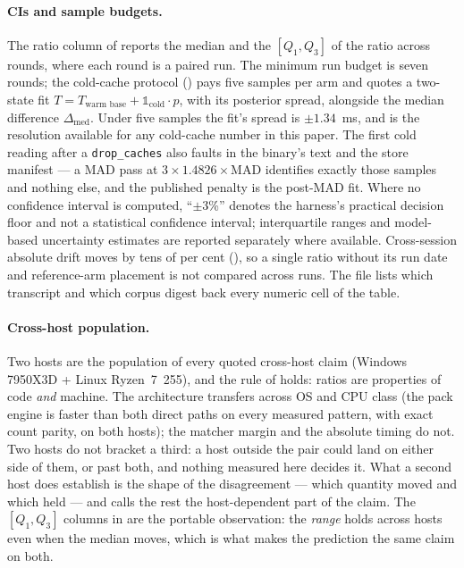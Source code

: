 \documentclass[11pt,letterpaper]{article}
\begin{document}
\paragraph{CIs and sample budgets.}
The ratio column of  reports the median and the
$[Q_1,Q_3]$ of the ratio across rounds, where each round is a paired
run. The minimum run budget is seven rounds; the cold-cache protocol
() pays five samples per arm and quotes a
two-state fit
$T = T_{\text{warm base}} + \mathbb{1}_{\text{cold}} \cdot p$, with its
posterior spread, alongside the median difference $\Delta_{\text{med}}$.
Under five samples the fit's spread is $\pm 1.34$~ms, and is the
resolution available for any cold-cache number in this paper. The first
cold reading after a \texttt{drop\_caches} also faults in the binary's
text and the store manifest --- a MAD pass at
$3 \times 1.4826 \times \text{MAD}$ identifies exactly those samples and
nothing else, and the published penalty is the post-MAD fit. Where no
confidence interval is computed, ``$\pm 3$\%'' denotes the harness's
practical decision floor and not a statistical confidence interval;
interquartile ranges and model-based uncertainty estimates are reported
separately where available. Cross-session absolute drift moves by tens of
per cent (), so a single ratio without its run date and
reference-arm placement is not compared across runs. The
 file lists which transcript and which corpus
digest back every numeric cell of the table.

\paragraph{Cross-host population.}
Two hosts are the population of every quoted cross-host claim (Windows
7950X3D + Linux Ryzen~7~255), and the rule of  holds:
ratios are properties of code \emph{and} machine. The architecture transfers
across OS and CPU class (the pack engine is faster than both direct paths
on every measured pattern, with exact count parity, on both hosts); the
matcher margin and the absolute timing do not. Two hosts do not bracket a
third: a host outside the pair could land on either side of them, or past
both, and nothing measured here decides it. What a second host does establish
is the shape of the disagreement --- which quantity moved and which held ---
and  calls the rest the host-dependent part of the claim. The
$[Q_1,Q_3]$ columns in  are the portable
observation: the \emph{range} holds across hosts even when the median
moves, which is what makes the prediction the same claim on both.
\end{document}
